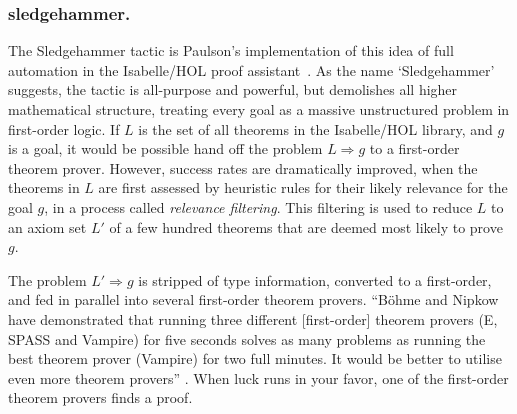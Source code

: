 \documentclass{llncs}
\begin{document}

\subsubsection{sledgehammer.}

The Sledgehammer tactic is Paulson's implementation of this idea of full automation in
the Isabelle/HOL proof assistant~\cite{Paar}.  As the name `Sledgehammer' suggests,
the tactic is all-purpose and powerful, but demolishes all higher
mathematical structure, treating every goal as a massive unstructured
problem in first-order logic.  If $L$ is the set of all theorems in
the Isabelle/HOL library, and $g$ is a goal, it would be possible hand
off the problem $L\Longrightarrow g$ to a first-order theorem
prover.  However, success rates are dramatically improved, when the
theorems in $L$ are first assessed by heuristic rules for their likely
relevance for the goal $g$, in a process called {\it relevance
  filtering}. 
This filtering is used to reduce $L$ to an axiom set $L'$ of a
few hundred theorems that are deemed most likely to prove $g$.

The problem $L'\Longrightarrow g$ is stripped
of type information, converted to a first-order, and fed
 in parallel into several first-order theorem provers.  
 ``B\"ohme and Nipkow \cite{Boehme-Nipkow-IJCAR10} have demonstrated that
running three different [first-order] theorem provers (E, SPASS and
Vampire) for five seconds solves as many problems as running the
best theorem prover (Vampire) for two full minutes.  It would be
better to utilise even more theorem provers'' 
\cite{Paar}.
When luck runs in your favor, one of the first-order theorem provers finds
a proof.
\end{document}
